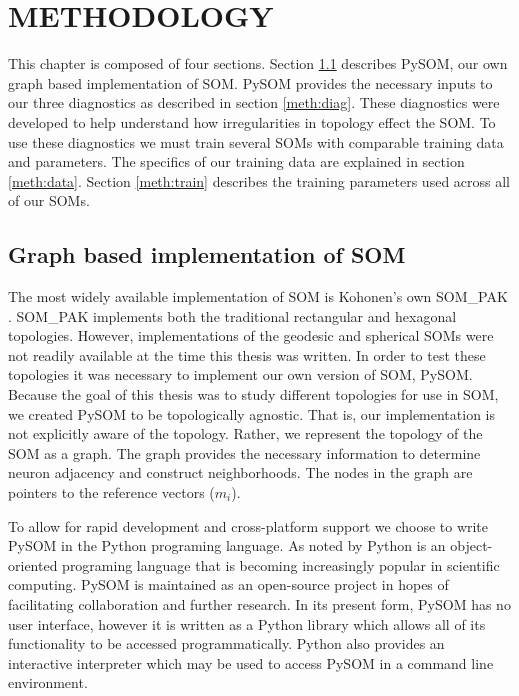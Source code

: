 \chapter{METHODOLOGY}
This chapter is composed of four sections.
Section \ref{meth:som} describes PySOM, our own graph based implementation of
SOM. PySOM provides the necessary inputs to our three diagnostics as described
in section \ref{meth:diag}.  These diagnostics were developed to help
understand how irregularities in topology effect the SOM. To use these
diagnostics we must train several SOMs with comparable training data and
parameters.  The specifics of our training data are explained in section
\ref{meth:data}.  Section \ref{meth:train} describes the training parameters used
across all of our SOMs.

\section{Graph based implementation of SOM}
\label{meth:som}
The most widely available implementation of SOM is Kohonen's
own SOM\_PAK \citep{kohonen1996}.  SOM\_PAK implements both the traditional
rectangular and hexagonal topologies.  However, implementations of the
geodesic and spherical SOMs were not readily available at the time this thesis
was written.  In order to test these topologies it was necessary to implement
our own version of SOM, PySOM.  Because the goal of this thesis was to study
different topologies for use in SOM, we created PySOM to be topologically agnostic.
That is, our implementation is not explicitly aware of the topology.  Rather, we
represent the topology of the SOM as a graph. The graph provides the necessary
information to determine neuron adjacency and construct neighborhoods.  The
nodes in the graph are pointers to the reference vectors ($m_i$).

To allow for rapid development and cross-platform support we choose to write PySOM
in the Python programing language. As noted by \cite{Rey2006} Python is an
object-oriented programing language that is becoming increasingly popular in
scientific computing. PySOM is maintained as an open-source project in hopes
of facilitating collaboration and further research.  In its present form,
PySOM has no user interface, however it is written as a Python library which
allows all of its functionality to be accessed programmatically. %
Python also provides an interactive interpreter which may be used to access
PySOM in a command line environment.

